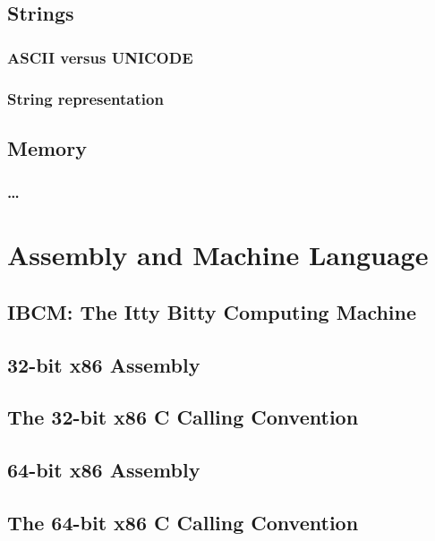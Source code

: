 \documentclass[11pt,twoside]{book}
\begin{document}
\chapter{Strings}

\section{ASCII versus UNICODE}

\section{String representation}


\chapter{Memory}

\section{\ldots}

\part{Assembly and Machine Language}

\chapter{IBCM: The Itty Bitty Computing Machine}



\chapter{32-bit x86 Assembly}



\chapter{The 32-bit x86 C Calling Convention}




\chapter{64-bit x86 Assembly}



\chapter{The 64-bit x86 C Calling Convention}
\end{document}
